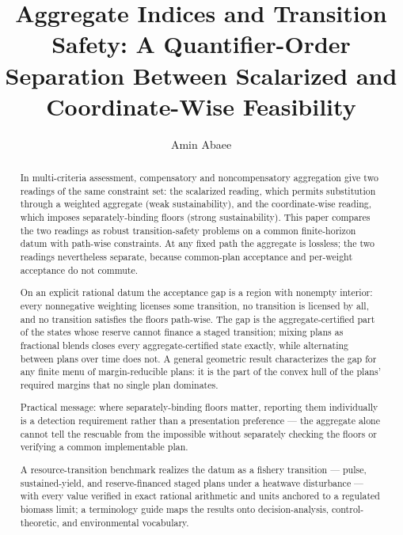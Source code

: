 \documentclass[3p,11pt]{elsarticle}
\begin{document}
\begin{frontmatter}

\title{Aggregate Indices and Transition Safety: A Quantifier-Order Separation Between Scalarized and Coordinate-Wise Feasibility}

\author[aff]{Amin Abaee}

\address[aff]{Independent Researcher, Tehran, Iran, \href{https://orcid.org/0000-0002-0019-1842}{ORCID: 0000-0002-0019-1842}, \href{mailto:amin_abaee@ut.ac.ir}{amin\_abaee@ut.ac.ir}}

\begin{abstract}

In multi-criteria assessment, compensatory and noncompensatory
aggregation give two readings of the same constraint set: the scalarized
reading, which permits substitution through a weighted aggregate (weak
sustainability), and the coordinate-wise reading, which imposes
separately-binding floors (strong sustainability). This paper compares
the two readings as robust transition-safety problems on a common
finite-horizon datum with path-wise constraints. At any fixed path the
aggregate is lossless; the two readings nevertheless separate, because
common-plan acceptance and per-weight acceptance do not commute.

On an explicit rational datum the acceptance gap is a region with
nonempty interior: every nonnegative weighting licenses some transition,
no transition is licensed by all, and no transition satisfies the floors
path-wise. The gap is the aggregate-certified part of the states whose
reserve cannot finance a staged transition; mixing plans as fractional
blends closes every aggregate-certified state exactly, while alternating
between plans over time does not.
A general geometric result characterizes the gap for any finite menu of
margin-reducible plans: it is the part of the convex hull of the plans'
required margins that no single plan dominates.

Practical message: where separately-binding floors matter, reporting
them individually is a detection requirement rather than a presentation
preference --- the aggregate alone cannot tell the rescuable from the
impossible without separately checking the floors or verifying a common
implementable plan.

A resource-transition benchmark realizes the datum as a fishery
transition --- pulse, sustained-yield, and reserve-financed staged plans
under a heatwave disturbance --- with every value verified in exact
rational arithmetic and units anchored to a regulated biomass limit; a
terminology guide maps the results onto decision-analysis,
control-theoretic, and environmental vocabulary.


\end{abstract}
\end{frontmatter}
\end{document}

